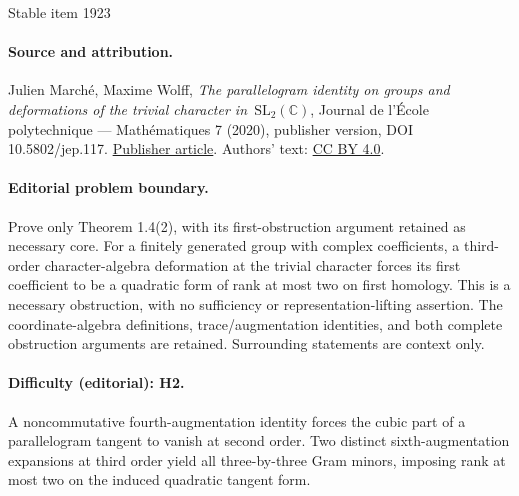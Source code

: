 \documentclass[11pt]{article}
\begin{document}
\begin{center}{\Large Stable item 1923}\end{center}
\paragraph{Source and attribution.}
Julien Marché, Maxime Wolff, \emph{The parallelogram identity on groups and deformations of the trivial character in $\mathrm{SL}_2(\mathbb{C})$}, Journal de l’École polytechnique — Mathématiques 7 (2020), publisher version, DOI 10.5802/jep.117. \href{https://jep.centre-mersenne.org/articles/10.5802/jep.117/}{Publisher article}. Authors' text: \href{https://creativecommons.org/licenses/by/4.0/}{CC BY 4.0}.
\paragraph{Editorial problem boundary.}
Prove only Theorem 1.4(2), with its first-obstruction argument retained as necessary core. For a finitely generated group with complex coefficients, a third-order character-algebra deformation at the trivial character forces its first coefficient to be a quadratic form of rank at most two on first homology. This is a necessary obstruction, with no sufficiency or representation-lifting assertion. The coordinate-algebra definitions, trace/augmentation identities, and both complete obstruction arguments are retained. Surrounding statements are context only.
\paragraph{Difficulty (editorial): H2.}
A noncommutative fourth-augmentation identity forces the cubic part of a parallelogram tangent to vanish at second order. Two distinct sixth-augmentation expansions at third order yield all three-by-three Gram minors, imposing rank at most two on the induced quadratic tangent form.
\end{document}
